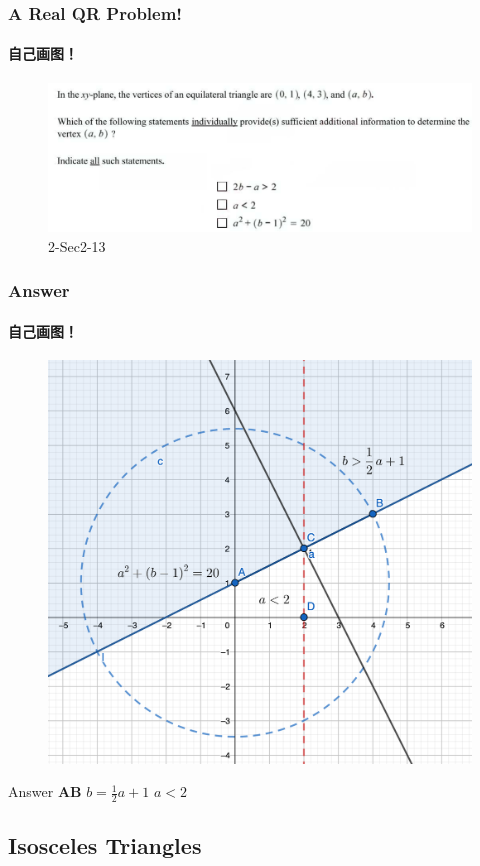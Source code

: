 \documentclass[
	11pt, %
]{beamer}
\begin{document}


\begin{frame}
	\frametitle{A Real QR Problem!}
	\framesubtitle{自己画图！}
	\begin{figure}
		\includegraphics[width=\linewidth]{Equilateral_Triangles_Example_Question1.png}
		\caption{2-Sec2-13}
	\end{figure}

\end{frame}



\begin{frame}
	\frametitle{Answer}
	\framesubtitle{自己画图！}
	\pause
	\begin{figure}
		\includegraphics[width=0.5\linewidth]{Equilateral_Triangles_Example_Question1_1.png}
	\end{figure}
	\pause
\bigskip
Answer \textbf{AB} $b =  \frac{1}{2} a + 1 $       $a<2$
\end{frame}


\subsection{Isosceles Triangles}

\end{document}
